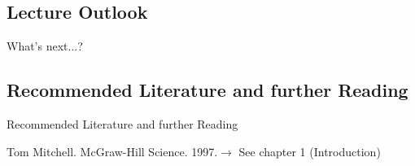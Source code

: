 \subsection{Lecture Outlook}

\begin{frame}{What's next...?}{}
\end{frame}


\subsection{Recommended Literature and further Reading}

\begin{frame}{Recommended Literature and further Reading}{}
	\footnotesize
	\begin{thebibliography}{2}
			{Tom Mitchell. McGraw-Hill Science. 1997.}{$\rightarrow$ See chapter 1 (Introduction)}
	\end{thebibliography}
\end{frame}


\makethanks

